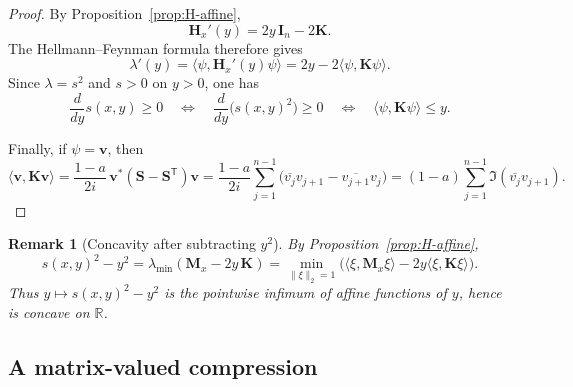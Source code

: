 \documentclass[11pt]{article}
\newtheorem{remark}[theorem]{Remark}
\begin{document}
\begin{proof}
By Proposition~\ref{prop:H-affine},
\[
\mathbf H_x'(y)=2y\,\mathbf I_n-2\mathbf K.
\]
The Hellmann--Feynman formula therefore gives
\[
\lambda'(y)=\langle \psi,\mathbf H_x'(y)\psi\rangle
=
2y-2\langle \psi,\mathbf K\psi\rangle.
\]
Since \(\lambda=s^2\) and \(s>0\) on \(y>0\), one has
\[
\frac{d}{dy}s(x,y)\ge 0
\quad\Longleftrightarrow\quad
\frac{d}{dy}\bigl(s(x,y)^2\bigr)\ge 0
\quad\Longleftrightarrow\quad
\langle \psi,\mathbf K\psi\rangle\le y.
\]

Finally, if \(\psi=\mathbf v\), then
\[
\langle \mathbf v,\mathbf K\mathbf v\rangle
=
\frac{1-a}{2i}\,\mathbf v^*(\mathbf S-\mathbf S^{\mathsf T})\mathbf v
=
\frac{1-a}{2i}\sum_{j=1}^{n-1}\bigl(\overline{v_j}v_{j+1}-\overline{v_{j+1}}v_j\bigr)
=
(1-a)\sum_{j=1}^{n-1}\Im(\overline{v_j}v_{j+1}).
\]
\end{proof}

\begin{remark}[Concavity after subtracting \(y^2\)]\label{rem:concavity}
By Proposition~\ref{prop:H-affine},
\[
s(x,y)^2-y^2
=
\lambda_{\min}(\mathbf M_x-2y\,\mathbf K)
=
\min_{\|\xi\|_2=1}\bigl(\langle \xi,\mathbf M_x\xi\rangle-2y\langle \xi,\mathbf K\xi\rangle\bigr).
\]
Thus \(y\mapsto s(x,y)^2-y^2\) is the pointwise infimum of affine functions of \(y\), hence is concave on \(\mathbb R\).
\end{remark}

\subsection*{A matrix-valued compression}
\end{document}
